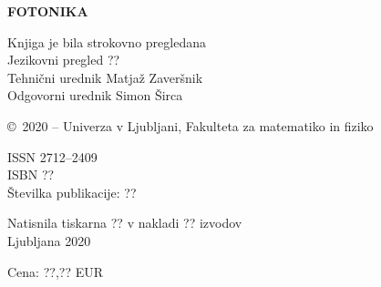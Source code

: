 \documentclass[a4paper,10pt,fleqn]{book}
\begin{document}
\bigskip
\textbf{FOTONIKA}

\bigskip
\bigskip
Knjiga je bila strokovno pregledana \\
Jezikovni pregled ?? \\
Tehnični urednik Matjaž Zaveršnik \\
Odgovorni urednik Simon Širca

\bigskip
\copyright\ 2020 -- Univerza v Ljubljani, Fakulteta za matematiko in fiziko

\bigskip
ISSN 2712--2409 \\
ISBN ?? \\
Številka publikacije: ??

\bigskip
Natisnila tiskarna ?? v nakladi ?? izvodov \\
Ljubljana 2020

\bigskip
Cena: ??,?? {\small EUR}

\end{document}
